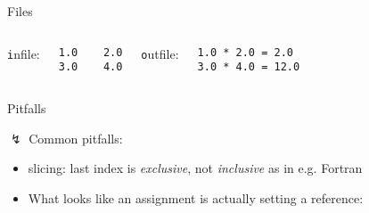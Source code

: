 \begin{frame}[fragile]{Files}



\begin{columns}
{\texttt infile}:
\begin{verbatim}
1.0    2.0
3.0    4.0
\end{verbatim}


{\texttt outfile}:
\begin{verbatim}
1.0 * 2.0 = 2.0
3.0 * 4.0 = 12.0
\end{verbatim}  

\end{columns}

\end{frame}

\begin{frame}{Pitfalls}

$\lightning$ Common pitfalls:

\begin{itemize}
    \item slicing: last index is \emph{exclusive}, not \emph{inclusive} as in e.g. Fortran
    
    \item What looks like an assignment is actually setting a reference:
    
\end{itemize}

\end{frame}
